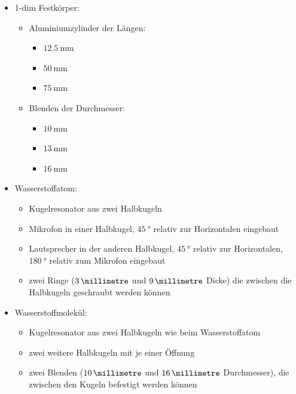 \begin{itemize}
    \item 1-dim Festkörper:
        \begin{itemize}
            \item Aluminiumzylinder der Längen:
                \begin{itemize}
                    \item $\SI{12,5}{\milli\metre}$ 
                    \item $\SI{50}{\milli\metre}$
                    \item $\SI{75}{\milli\metre}$
                \end{itemize}
            \item Blenden der Durchmesser:
                \begin{itemize}
                    \item $\SI{10}{\milli\metre}$
                    \item $\SI{13}{\milli\metre}$
                    \item $\SI{16}{\milli\metre}$
                \end{itemize}
        \end{itemize}
    \item Wasserstoffatom:
        \begin{itemize}
            \item Kugelresonator aus zwei Halbkugeln
            \item Mikrofon in einer Halbkugel, $\SI{45}{\degree}$ relativ zur Horizontalen eingebaut
            \item Lautsprecher in der anderen Halbkugel, $\SI{45}{\degree}$ relativ zur Horizontalen, $\SI{180}{\degree}$ relativ zum Mikrofon eingebaut
            \item zwei Ringe ($\SI{3}{\millimetre}$ und $\SI{9}{\millimetre}$ Dicke) die zwischen die Halbkugeln geschraubt werden können
        \end{itemize}
    \item Wasserstoffmolekül:
        \begin{itemize}
            \item Kugelresonator aus zwei Halbkugeln wie beim Wasserstoffatom
            \item zwei weitere Halbkugeln mit je einer Öffnung
            \item zwei Blenden ($\SI{10}{\millimetre}$ und $\SI{16}{\millimetre}$ Durchmesser), die zwischen den Kugeln befestigt werden können
        \end{itemize}
\end{itemize}

